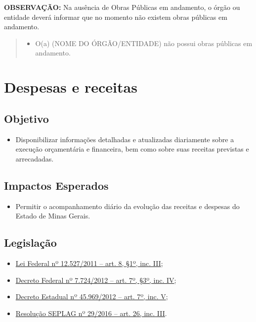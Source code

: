 \documentclass[
]{book}
\providecommand{\tightlist}{%
  \setlength{\itemsep}{0pt}\setlength{\parskip}{0pt}}
\begin{document}
\textbf{OBSERVAÇÃO:} Na ausência de Obras Públicas em andamento, o órgão ou entidade deverá informar que no momento não existem obras públicas em andamento.

\begin{quote}
\begin{itemize}
\tightlist
\item
  O(a) (NOME DO ÓRGÃO/ENTIDADE) não possui obras públicas em andamento.
\end{itemize}
\end{quote}

\hypertarget{despesas-e-receitas}{%
\section{Despesas e receitas}\label{despesas-e-receitas}}

\hypertarget{objetivo-4}{%
\subsection{Objetivo}\label{objetivo-4}}

\begin{itemize}
\tightlist
\item
  Disponibilizar informações detalhadas e atualizadas diariamente sobre a execução orçamentária e financeira, bem como sobre suas receitas previstas e arrecadadas.
\end{itemize}

\hypertarget{impactos-esperados-5}{%
\subsection{Impactos Esperados}\label{impactos-esperados-5}}

\begin{itemize}
\tightlist
\item
  Permitir o acompanhamento diário da evolução das receitas e despesas do Estado de Minas Gerais.
\end{itemize}

\hypertarget{legislauxe7uxe3o-5}{%
\subsection{Legislação}\label{legislauxe7uxe3o-5}}

\begin{itemize}
\tightlist
\item
  \href{http://www.planalto.gov.br/ccivil_03/_ato2011-2014/2011/lei/l12527.htm\#art8}{Lei Federal nº 12.527/2011 -- art. 8, §1º, inc. III};
\item
  \href{http://www.planalto.gov.br/ccivil_03/_ato2011-2014/2012/decreto/d7724.htm\#art7}{Decreto Federal nº 7.724/2012 -- art. 7º, §3º, inc. IV};
\item
  \href{https://www.almg.gov.br/consulte/legislacao/completa/completa.html?tipo=DEC\&num=45969\&ano=2012}{Decreto Estadual nº 45.969/2012 -- art. 7º, inc. V};
\item
  \href{http://www.planejamento.mg.gov.br/sites/default/files/documentos/resolucao_sitios_seplag_29_de_05_07_2016_1.pdf}{Resolução SEPLAG nº 29/2016 -- art. 26, inc. III}.
\end{itemize}
\end{document}

